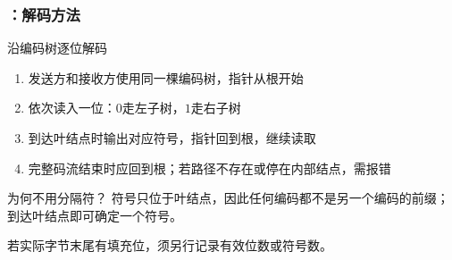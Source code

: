 \begin{frame}
    \frametitle{\insertsubsectionhead：解码方法}
    \begin{block}{沿编码树逐位解码}
        \begin{enumerate}
            \item 发送方和接收方使用同一棵编码树，指针从根开始
            \item 依次读入一位：$0$走左子树，$1$走右子树
            \item 到达叶结点时输出对应符号，指针回到根，继续读取
            \item 完整码流结束时应回到根；若路径不存在或停在内部结点，需报错
        \end{enumerate}
    \end{block}
    \begin{exampleblock}{为何不用分隔符？}
        符号只位于叶结点，因此任何编码都不是另一个编码的前缀；
        到达叶结点即可确定一个符号。
    \end{exampleblock}
    \small 若实际字节末尾有填充位，须另行记录有效位数或符号数。
\end{frame}

